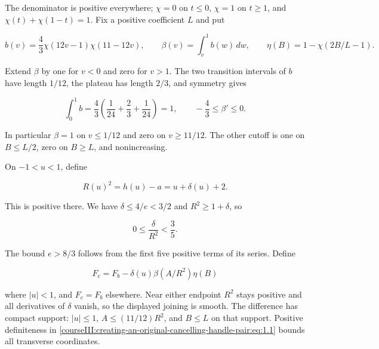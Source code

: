 The denominator is positive everywhere; \(\chi=0\) on \(t\leq0\), \(\chi=1\) on \(t\geq1\), and \(\chi(t)+\chi(1-t)=1\). Fix a positive coefficient \(L\) and put

\begin{equation}
b(v)=\frac43\chi(12v-1)\chi(11-12v),\qquad
 \beta(v)=\int_v^1 b(w)\,dw,\qquad
 \eta(B)=1-\chi(2B/L-1).
 \label{courseIII:creating-an-original-cancelling-handle-pair:eq:1.8}
\end{equation}

Extend \(\beta\) by one for \(v<0\) and zero for \(v>1\). The two transition intervals of \(b\) have length \(1/12\), the plateau has length \(2/3\), and symmetry gives

\begin{equation}
\int_0^1b=\frac43\left(\frac1{24}+\frac23+\frac1{24}\right)=1,
 \qquad -\frac43\leq\beta'\leq0.
 \label{courseIII:creating-an-original-cancelling-handle-pair:eq:1.9}
\end{equation}

In particular \(\beta=1\) on \(v\leq1/12\) and zero on \(v\geq11/12\). The other cutoff is one on \(B\leq L/2\), zero on \(B\geq L\), and nonincreasing.

On \(-1<u<1\), define

\begin{equation}
R(u)^2=h(u)-a=u+\delta(u)+2.
 \label{courseIII:creating-an-original-cancelling-handle-pair:eq:1.10}
\end{equation}

This is positive there. We have \(\delta\leq4/e<3/2\) and \(R^2\geq1+\delta\), so

\begin{equation}
0\leq\frac{\delta}{R^2}<\frac35.
 \label{courseIII:creating-an-original-cancelling-handle-pair:eq:1.11}
\end{equation}

The bound \(e>8/3\) follows from the first five positive terms of its series. Define

\begin{equation}
F_c=F_b-\delta(u)\beta(A/R^2)\eta(B)
 \label{courseIII:creating-an-original-cancelling-handle-pair:eq:1.12}
\end{equation}

where \(|u|<1\), and \(F_c=F_b\) elsewhere. Near either endpoint \(R^2\) stays positive and all derivatives of \(\delta\) vanish, so the displayed joining is smooth. The difference has compact support: \(|u|\leq1\), \(A\leq(11/12)R^2\), and \(B\leq L\) on that support. Positive definiteness in \eqref{courseIII:creating-an-original-cancelling-handle-pair:eq:1.1} bounds all transverse coordinates.

